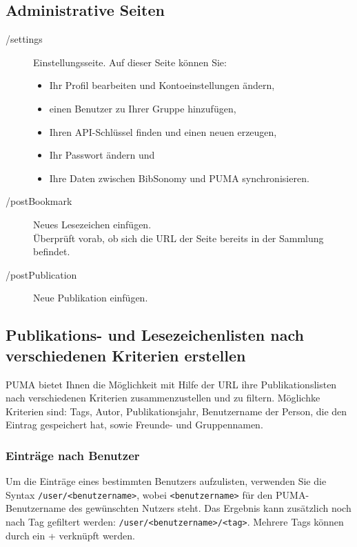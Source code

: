 \subsection{Administrative Seiten}
\label{subsec:adminSeiten}
\begin{description}
\item [/settings]  Einstellungsseite. Auf dieser Seite können Sie:
    \begin{itemize}
        \item Ihr Profil bearbeiten und Kontoeinstellungen ändern,
        \item einen Benutzer zu Ihrer Gruppe hinzufügen,
        \item Ihren API-Schlüssel finden und einen neuen erzeugen,
        \item Ihr Passwort ändern und
        \item Ihre Daten zwischen BibSonomy und PUMA synchronisieren.
    \end{itemize}
    \item [/postBookmark]    Neues Lesezeichen einfügen. \hfill \\Überprüft vorab, ob sich die URL der Seite bereits in der Sammlung befindet.
    \item [/postPublication]    Neue Publikation einfügen. 
\end{description}

\subsection{Publikations- und Lesezeichenlisten nach verschiedenen Kriterien erstellen}
\label{subsec:suchenMitUrlSyntax}
PUMA bietet Ihnen die Möglichkeit mit Hilfe der URL ihre Publikationslisten nach verschiedenen Kriterien zusammenzustellen und zu filtern. Möglichke Kriterien sind: Tags, Autor, Publikationsjahr, Benutzername der Person, die den Eintrag gespeichert hat, sowie Freunde- und Gruppennamen. 

\subsubsection*{Einträge nach Benutzer}
\label{sss:nachBenutzer}

Um die Einträge eines bestimmten Benutzers aufzulisten, verwenden Sie die Syntax \texttt{/user/<benutzername>}, wobei \texttt{<benutzername>} für den PUMA-Benutzername des gewünschten Nutzers steht. Das Ergebnis kann zusätzlich noch nach Tag gefiltert werden: \texttt{/user/<benutzername>/<tag>}. Mehrere Tags können durch ein + verknüpft werden.

